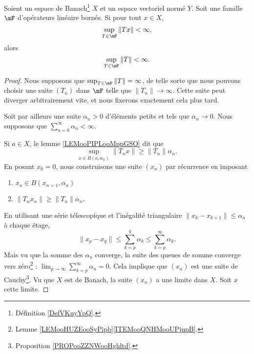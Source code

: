 \begin{theorem}       \label{THOooJHVNooIDDxyT}
    Soient un espace de Banach\footnote{Définition \ref{DefVKuyYpQ}.} \( X\) et un espace vectoriel normé \( Y\). Soit une famille \( \mF\) d'opérateurs linéaire bornés. Si pour tout \( x\in  X\),
    \begin{equation}
        \sup_{T\in\mF}\| Tx \|<\infty,
    \end{equation}
    alors 
    \begin{equation}
        \sup_{T\in \mF}\| T \|<\infty.
    \end{equation}
\end{theorem}

\begin{proof}
    Nous supposons que \( \sup_{T\in\mF}\| T \|=\infty\), de telle sorte que nous pouvons choisir une suite \( (T_n)\) dans \( \mF\) telle que \( \| T_n \|\to \infty\). Cette suite peut diverger arbitrairement vite, et nous fixerons exactement cela plus tard.

    Soit par ailleurs une suite \( \alpha_n>0\) d'éléments petits et tels que \( \alpha_n\to 0\). Nous supposons que \( \sum_{n=0}^{\infty}\alpha_n<\infty\).

    Si \( a\in X\), le lemme \ref{LEMooPIPLooMppGSO} dit que
    \begin{equation}
        \sup_{x\in B(a,\alpha_n)}\| T_nx \|\geq \| T_n \|\alpha_n.
    \end{equation}
    En posant \( x_0=0\), nous construisons une suite \( (x_n)\) par récurrence en imposant
    \begin{enumerate}
        \item
            \( x_n\in B(x_{n=1}, \alpha_n)\)
        \item
            \( \| T_nx_n \|\geq \| T_n \|\alpha_n\).
    \end{enumerate}
    En utilisant une série télescopique et l'inégalité triangulaire \( \| x_k-x_{k+1} \|\leq \alpha_n\) à chaque étage,
    \begin{equation}
        \| x_p-x_q \|\leq \sum_{k=p}^q\alpha_k\leq \sum_{k=p}^{\infty}\alpha_k.
    \end{equation}
    Mais vu que la somme des \( \alpha_n\) converge, la suite des queues de somme converge vers zéro\footnote{Lemme \ref{LEMooHUZEooSyPipb}\ref{ITEMooQNHMooUPjupB}.} : \( \lim_{p\to \infty}\sum_{k=p}^{\infty}\alpha_n=0\). Cela implique que \( (x_n)\) est une suite de Cauchy\footnote{Proposition \ref{PROPooZZNWooHghltd}.}. Vu que \( X\) est de Banach, la suite \( (x_n)\) a une limite dans \( X\). Soit \( x\) cette limite.


\end{proof}
